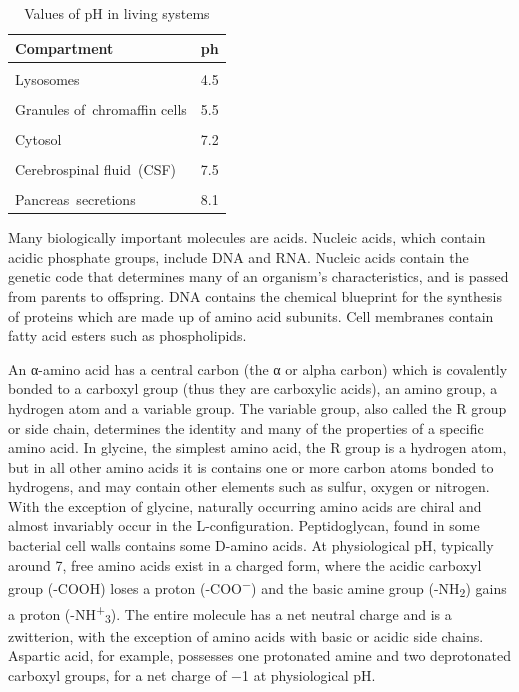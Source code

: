 \documentclass[
]{book}
\begin{document}
\begin{table}[!h]

\caption{\label{tab:pH}Values of pH in living systems}
\centering
\begin{tabular}[t]{lc}
\toprule
Compartment & ph\\
\midrule
\cellcolor{gray!6}{Gastric acid} & \cellcolor{gray!6}{1.5-3.5}\\
Lysosomes & 4.5\\
\cellcolor{gray!6}{Human skin} & \cellcolor{gray!6}{4.7}\\
Granules of chromaffin cells & 5.5\\
\cellcolor{gray!6}{Urine} & \cellcolor{gray!6}{6}\\
\addlinespace
Cytosol & 7.2\\
\cellcolor{gray!6}{Blood (natural pH)} & \cellcolor{gray!6}{7.34–7.45}\\
Cerebrospinal fluid (CSF) & 7.5\\
\cellcolor{gray!6}{Mitochondrial matrix} & \cellcolor{gray!6}{7.5}\\
Pancreas secretions & 8.1\\
\bottomrule
\end{tabular}
\end{table}

Many biologically important molecules are acids. Nucleic acids, which contain acidic phosphate groups, include DNA and RNA. Nucleic acids contain the genetic code that determines many of an organism's characteristics, and is passed from parents to offspring. DNA contains the chemical blueprint for the synthesis of proteins which are made up of amino acid subunits. Cell membranes contain fatty acid esters such as phospholipids.

An α-amino acid has a central carbon (the α or alpha carbon) which is covalently bonded to a carboxyl group (thus they are carboxylic acids), an amino group, a hydrogen atom and a variable group. The variable group, also called the R group or side chain, determines the identity and many of the properties of a specific amino acid. In glycine, the simplest amino acid, the R group is a hydrogen atom, but in all other amino acids it is contains one or more carbon atoms bonded to hydrogens, and may contain other elements such as sulfur, oxygen or nitrogen. With the exception of glycine, naturally occurring amino acids are chiral and almost invariably occur in the L-configuration. Peptidoglycan, found in some bacterial cell walls contains some D-amino acids. At physiological pH, typically around 7, free amino acids exist in a charged form, where the acidic carboxyl group (-COOH) loses a proton (-COO\textsuperscript{−}) and the basic amine group (-NH\textsubscript{2}) gains a proton (-NH\textsuperscript{+}\textsubscript{3}). The entire molecule has a net neutral charge and is a zwitterion, with the exception of amino acids with basic or acidic side chains. Aspartic acid, for example, possesses one protonated amine and two deprotonated carboxyl groups, for a net charge of −1 at physiological pH.
\end{document}
